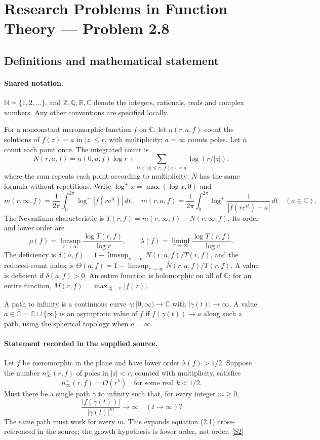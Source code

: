 \documentclass[11pt]{article}
\newcommand{\sref}[2]{\hyperlink{source:#1:#2}{[S#2]}}
\begin{document}
\section{Research Problems in Function Theory — Problem 2.8}\label{statement}

\subsection{Definitions and mathematical statement}

\paragraph{Shared notation.}$\mathbb N=\{1,2,\ldots\}$, and $\mathbb Z,\mathbb Q,\mathbb R,\mathbb C$ denote the integers, rationals, reals and complex numbers. Any other conventions are specified locally.


For a nonconstant meromorphic function $f$ on $\mathbb C$, let $n(r,a,f)$ count the solutions of $f(z)=a$ in $|z|\le r$, with multiplicity; $a=\infty$ counts poles. Let $\bar n$ count each point once. The integrated count is
\[
 N(r,a,f)=n(0,a,f)\log r+\sum_{0<|z|\le r,\ f(z)=a}\log(r/|z|),
\]
where the sum repeats each point according to multiplicity; $\bar N$ has the same formula without repetitions. Write $\log^+x=\max(\log x,0)$ and
\[
 m(r,\infty,f)=\frac1{2\pi}\int_0^{2\pi}\log^+|f(re^{it})|\,dt,\quad
 m(r,a,f)=\frac1{2\pi}\int_0^{2\pi}\log^+\frac1{|f(re^{it})-a|}\,dt\quad(a\in\mathbb C).
\]
The Nevanlinna characteristic is $T(r,f)=m(r,\infty,f)+N(r,\infty,f)$. Its order and lower order are
\[
 \rho(f)=\limsup_{r\to\infty}\frac{\log T(r,f)}{\log r},\qquad
 \lambda(f)=\liminf_{r\to\infty}\frac{\log T(r,f)}{\log r}.
\]
The deficiency is $\delta(a,f)=1-\limsup_{r\to\infty}N(r,a,f)/T(r,f)$, and the reduced-count index is $\Theta(a,f)=1-\limsup_{r\to\infty}\bar N(r,a,f)/T(r,f)$. A value is deficient if $\delta(a,f)>0$. An entire function is holomorphic on all of $\mathbb C$; for an entire function, $M(r,f)=\max_{|z|=r}|f(z)|$.

A path to infinity is a continuous curve $\gamma:[0,\infty)\to\mathbb C$ with $|\gamma(t)|\to\infty$. A value $a\in\widehat{\mathbb C}=\mathbb C\cup\{\infty\}$ is an asymptotic value of $f$ if $f(\gamma(t))\to a$ along such a path, using the spherical topology when $a=\infty$.
\paragraph{Statement recorded in the supplied source.}
Let $f$ be meromorphic in the plane and have lower order $\lambda(f)>1/2$. Suppose the number $n_\infty^{<}(r,f)$ of poles in $|z|<r$, counted with multiplicity, satisfies
\[
 n_\infty^{<}(r,f)=O(r^k)\quad\text{for some real }k<1/2.
\]
Must there be a single path $\gamma$ to infinity such that, for every integer $m\ge0$,
\[
 \frac{|f(\gamma(t))|}{|\gamma(t)|^m}\longrightarrow\infty\quad(t\to\infty)?
\]
The same path must work for every $m$. This expands equation (2.1) cross-referenced in the source; the growth hypothesis is lower order, not order. \sref{statement}{2}
\end{document}
